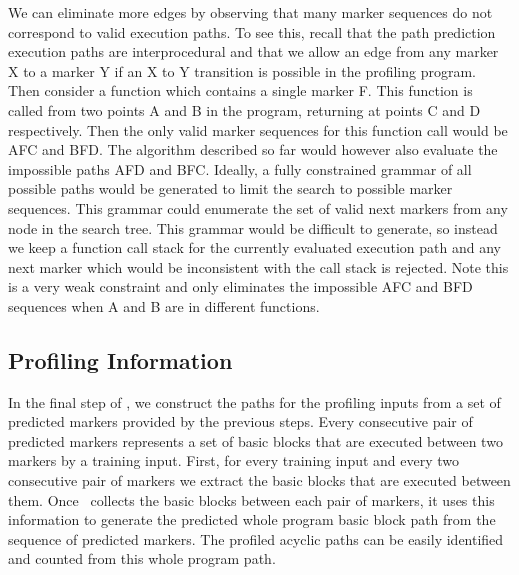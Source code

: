 We can eliminate more edges by observing that many marker sequences do not correspond to valid execution paths. To see this, recall that the path prediction execution paths are interprocedural and that we allow an edge from any marker X to a marker Y if an X to Y transition is possible in the profiling program. Then consider a function which contains a single marker F. This function is called from two points A and B in the program, returning at points C and D respectively. Then the only valid marker sequences for this function call would be AFC and BFD. The algorithm described so far would however also evaluate the impossible paths AFD and BFC. Ideally, a fully constrained grammar of all possible paths would be generated to limit the search to possible marker sequences. This grammar could enumerate the set of valid next markers from any node in the search tree. This grammar would be difficult to generate, so instead we keep a function call stack for the currently evaluated execution path and any next marker which would be inconsistent with the call stack is rejected. Note this is a very weak constraint and only eliminates the impossible AFC and BFD sequences when A and B are in different functions.


\subsection{Profiling Information}
\label{sec:predict_path}

In the final step of \zop, we construct the paths for the profiling inputs from a set of predicted markers provided by the previous steps. Every consecutive pair of predicted markers represents a set of basic blocks that are executed between two markers by a training input. First, for every training input and every two consecutive pair of markers we extract the basic blocks that are executed between them.  Once \zop\ collects the basic blocks between each pair of markers, it uses this information to generate the predicted whole program basic block path from the sequence of predicted markers. The profiled acyclic paths can be easily identified and counted from this whole program path.

